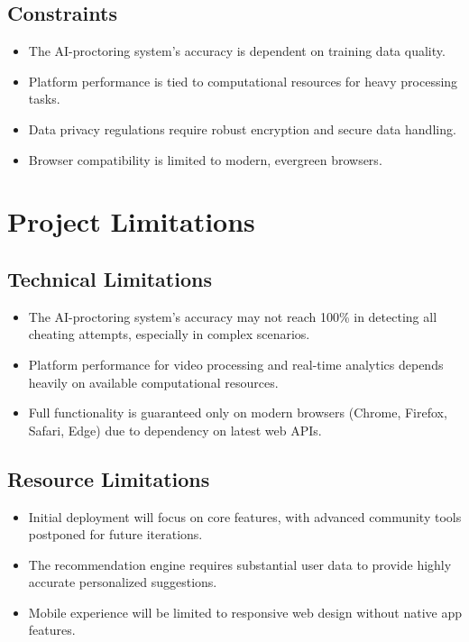 \subsection{Constraints}
\label{subsec:constraints}
\begin{itemize}
    \item The AI-proctoring system's accuracy is dependent on training data quality.
    \item Platform performance is tied to computational resources for heavy processing tasks.
    \item Data privacy regulations require robust encryption and secure data handling.
    \item Browser compatibility is limited to modern, evergreen browsers.
\end{itemize}

\section{Project Limitations}
\label{sec:project_limitations}

\subsection{Technical Limitations}
\label{subsec:tech_limitations}
\begin{itemize}
    \item The AI-proctoring system's accuracy may not reach 100\% in detecting all cheating attempts, especially in complex scenarios.
    \item Platform performance for video processing and real-time analytics depends heavily on available computational resources.
    \item Full functionality is guaranteed only on modern browsers (Chrome, Firefox, Safari, Edge) due to dependency on latest web APIs.
\end{itemize}

\subsection{Resource Limitations}
\label{subsec:resource_limitations}
\begin{itemize}
    \item Initial deployment will focus on core features, with advanced community tools postponed for future iterations.
    \item The recommendation engine requires substantial user data to provide highly accurate personalized suggestions.
    \item Mobile experience will be limited to responsive web design without native app features.
\end{itemize}

